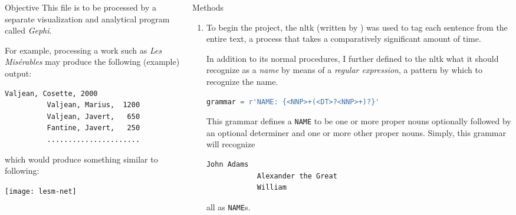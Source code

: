 \documentclass{beamer}
\newcommand{\Gephi}{\textit{Gephi}\xspace}
\begin{document}
\begin{frame}[t,fragile]{}
\begin{columns}
\begin{column}{.45\textwidth}
\begin{block}{Objective}
        This file is to be processed by a separate visualization and
        analytical program called \Gephi.

        For example, processing a work such as \textit{Les
          Mis\'erables} may produce the following (example) output:

        \vspace{1ex plus 0.1ex minus 0.1ex}
        
        \begin{lstlisting}[frame=shadowbox]
          Valjean, Cosette, 2000
          Valjean, Marius,  1200
          Valjean, Javert,   650
          Fantine, Javert,   250
          ......................
        \end{lstlisting}

        which would produce something similar to following:

        \texttt{[image: lesm-net]}
      \end{block}
    \end{column}

    \begin{column}{.45\textwidth}

      \begin{block}{Methods}

        \begin{enumerate}
        \item To begin the project, the \ac{nltk} (written by
          \cite{bird09:nltk}) was used to tag each sentence from the
          entire text, a process that takes a comparatively significant
          amount of time.
          
          In addition to its normal procedures, I further defined to the
          \ac{nltk} what it should recognize as a \emph{name} by means
          of a \emph{regular expression}, a pattern by which to
          recognize the name.
          \medskip
          \begin{lstlisting}[language=Python,
                             basicstyle=\ttfamily,
                             frame=shadowbox]
            grammar = r'NAME: {<NNP>+(<DT>?<NNP>+)?}'
          \end{lstlisting}
          This grammar defines a \lstinline!NAME! to be one or more
          proper nouns optionally followed by an optional determiner and
          one or more other proper nouns.
          Simply, this grammar will recognize
          \medskip
          \begin{lstlisting}[frame=shadowbox]
            John Adams
            Alexander the Great
            William
          \end{lstlisting}
          all as \lstinline!NAME!s.


\end{enumerate}
\end{block}
\end{column}
\end{columns}
\end{frame}
\end{document}
